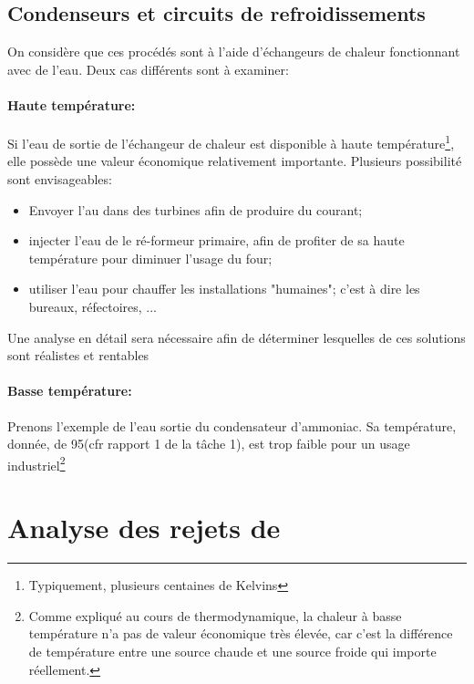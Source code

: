 \documentclass[10pt,a4paper]{report}
\begin{document}
\subsection{Condenseurs et circuits de refroidissements}
On considère que ces procédés sont à l'aide d'échangeurs de chaleur fonctionnant avec de l'eau. Deux cas différents sont à examiner:
\paragraph*{Haute température:}Si l'eau de sortie de l'échangeur de chaleur est disponible à haute température\footnote{Typiquement, plusieurs centaines de Kelvins}, elle possède une valeur économique relativement importante. Plusieurs possibilité sont envisageables:
\begin{itemize}
\item Envoyer l'au dans des turbines afin de produire du courant;
\item injecter l'eau de le ré-formeur primaire, afin de profiter de sa haute température pour diminuer l'usage du four;
\item utiliser l'eau pour chauffer les installations "humaines"; c'est à dire les bureaux, réfectoires, ...
\end{itemize}
Une analyse en détail sera nécessaire afin de déterminer lesquelles de ces solutions sont réalistes et rentables
\paragraph*{Basse température:} Prenons l'exemple de l'eau sortie du condensateur d'ammoniac. Sa température, donnée, de \unit{95}{\degree}(cfr rapport 1 de la tâche 1), %
est trop faible pour un usage industriel\footnote{Comme expliqué au cours de thermodynamique, la chaleur à basse température n'a pas de valeur économique très élevée, car c'est la différence de température entre une source chaude et une source froide qui importe réellement.}
\section{Analyse des rejets de }
\end{document}
